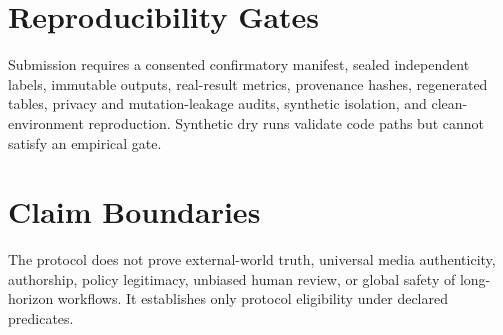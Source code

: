 \documentclass[sigconf,anonymous,review]{acmart}
\begin{document}
\section{Reproducibility Gates}
Submission requires a consented confirmatory manifest, sealed independent labels, immutable outputs, real-result metrics, provenance hashes, regenerated tables, privacy and mutation-leakage audits, synthetic isolation, and clean-environment reproduction. Synthetic dry runs validate code paths but cannot satisfy an empirical gate.

\section{Claim Boundaries}
The protocol does not prove external-world truth, universal media authenticity, authorship, policy legitimacy, unbiased human review, or global safety of long-horizon workflows. It establishes only protocol eligibility under declared predicates.
\end{document}
